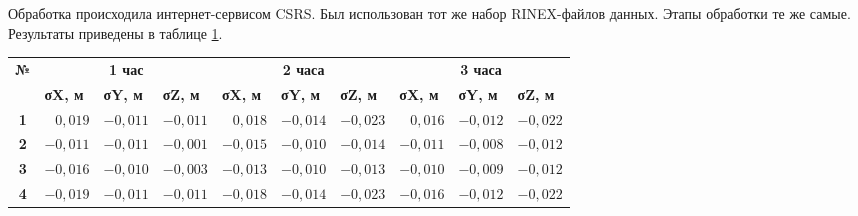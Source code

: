 Обработка происходила интернет-сервисом CSRS. Был использован тот же набор RINEX-файлов данных. Этапы обработки те же самые. Результаты приведены в таблице \cref{tab:tab09}.


\begin{table} [htbp]
	\centering\small
	\label{tab:tab09}{%
		\begin{tabular}{|c|rrr|rrr|rrr|}
			\hline
			\multirow{2}{*}{\textbf{№}} & 
			\multicolumn{3}{c|}{\textbf{1 час}}                                                                             & \multicolumn{3}{c|}{\textbf{2 часа}}                                                                            & \multicolumn{3}{c|}{\textbf{3 часа}}                                                                            \\ \cline{2-10} 
			& \multicolumn{1}{l|}{\textbf{σX, м}} & \multicolumn{1}{l|}{\textbf{σY, м}} & \multicolumn{1}{l|}{\textbf{σZ, м}} & \multicolumn{1}{l|}{\textbf{σX, м}} & \multicolumn{1}{l|}{\textbf{σY, м}} & \multicolumn{1}{l|}{\textbf{σZ, м}} & \multicolumn{1}{l|}{\textbf{σX, м}} & \multicolumn{1}{l|}{\textbf{σY, м}} & \multicolumn{1}{l|}{\textbf{σZ, м}} \\ \hline
			\textbf{1}                  & 
			\multicolumn{1}{r|}{$ 0,019$}       & \multicolumn{1}{r|}{$-0,011$}       & $-0,011$                            & \multicolumn{1}{r|}{$ 0,018$}       & \multicolumn{1}{r|}{$-0,014$}       & $-0,023$                            & \multicolumn{1}{r|}{$ 0,016$}       & \multicolumn{1}{r|}{$-0,012$}       & $-0,022$                            \\ \hline
			\textbf{2}                  & 
			\multicolumn{1}{r|}{$-0,011$}       & \multicolumn{1}{r|}{$-0,011$}       & $-0,001$                            & \multicolumn{1}{r|}{$-0,015$}       & \multicolumn{1}{r|}{$-0,010$}       & $-0,014$                            & \multicolumn{1}{r|}{$-0,011$}       & \multicolumn{1}{r|}{$-0,008$}       & $-0,012$                            \\ \hline
			\textbf{3}                  & 
			\multicolumn{1}{r|}{$-0,016$}       & \multicolumn{1}{r|}{$-0,010$}       & $-0,003$                            & \multicolumn{1}{r|}{$-0,013$}       & \multicolumn{1}{r|}{$-0,010$}       & $-0,013$                            & \multicolumn{1}{r|}{$-0,010$}       & \multicolumn{1}{r|}{$-0,009$}       & $-0,012$                            \\ \hline
			\textbf{4}                  & 
			\multicolumn{1}{r|}{$-0,019$}       & \multicolumn{1}{r|}{$-0,011$}       & $-0,011$                            & \multicolumn{1}{r|}{$-0,018$}       & \multicolumn{1}{r|}{$-0,014$}       & $-0,023$                            & \multicolumn{1}{r|}{$-0,016$}       & \multicolumn{1}{r|}{$-0,012$}       & $-0,022$                            \\ \hline

\end{tabular}}
\end{table}
